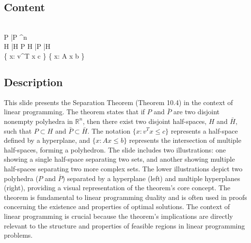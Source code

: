 \documentclass{article}%
\begin{document}
\subsection{Content}%

\underline{} \\
 P  \bar{P}  ^n  \\
 H  \bar{H}  P \subset H  \bar{P} \subset \bar{H} \\
\{ x: v^T x \le c \} \quad \quad \quad \quad \quad \{ x: A x \le b \}
%
\subsection{Description}%
This slide presents the Separation Theorem (Theorem 10.4) in the context of linear programming.  The theorem states that if $P$ and $\bar{P}$ are two disjoint nonempty polyhedra in $\mathbb{R}^n$, then there exist two disjoint half-spaces, $H$ and $\bar{H}$, such that $P \subset H$ and $\bar{P} \subset \bar{H}$.  The notation $\{x: v^Tx \le c\}$ represents a half-space defined by a hyperplane, and $\{x: Ax \le b\}$ represents the intersection of multiple half-spaces, forming a polyhedron.  The slide includes two illustrations: one showing a single half-space separating two sets, and another showing multiple half-spaces separating two more complex sets.  The lower illustrations depict two polyhedra ($P$ and $\bar{P}$) separated by a hyperplane (left) and multiple hyperplanes (right), providing a visual representation of the theorem's core concept.  The theorem is fundamental to linear programming duality and is often used in proofs concerning the existence and properties of optimal solutions. The context of linear programming is crucial because the theorem's implications are directly relevant to the structure and properties of feasible regions in linear programming problems.%
\end{document}
